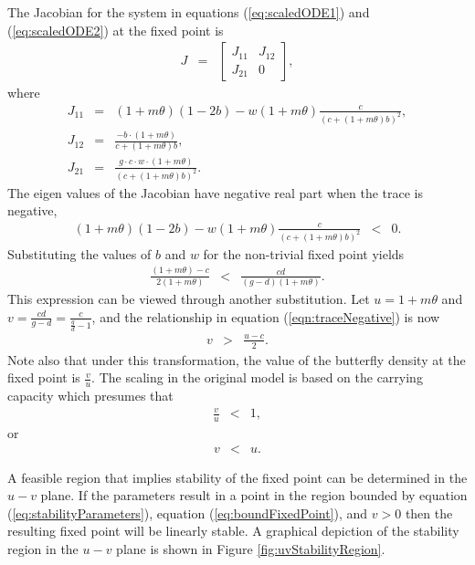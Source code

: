 \documentclass[12pt]{article}
\begin{document}
The Jacobian for the system in equations (\ref{eq:scaledODE1}) and
(\ref{eq:scaledODE2}) at the fixed point is
\begin{eqnarray}
  J & = &
          \left[
          \begin{array}{rr}
            J_{11} & J_{12} \\
            J_{21} & 0
          \end{array}
          \right],
\end{eqnarray}
where
\begin{eqnarray}
  \label{eq:jacobian}
  J_{11} & = & (1+m\theta)(1-2b) - w (1+m\theta)\frac{c}{(c+(1+m\theta)b)^2}, \\
  J_{12} & = & \frac{-b\cdot(1+m\theta)}{c+(1+m\theta)b}, \\
  J_{21} & = & \frac{g\cdot c \cdot w \cdot (1+m\theta)}{(c+(1+m\theta)b)^2}.
\end{eqnarray}
The eigen values of the Jacobian have negative real part when the
trace is negative,
\begin{eqnarray}
  (1+m\theta)(1-2b) - w (1+m\theta)\frac{c}{(c+(1+m\theta)b)^2} & < & 0.
\end{eqnarray}
Substituting the values of $b$ and $w$ for the non-trivial fixed point
yields
\begin{eqnarray}
  \label{eqn:traceNegative}
  \frac{(1+m\theta)-c}{2(1+m\theta)} & < & \frac{cd}{(g-d)(1+m\theta)}.
\end{eqnarray}
This expression can be viewed through another substitution. Let
$u=1+m\theta$ and $v=\frac{cd}{g-d}=\frac{c}{\frac{g}{d}-1}$, and the
relationship in equation (\ref{eqn:traceNegative}) is now
\begin{eqnarray}
  \label{eq:stabilityParameters}
  v & > & \frac{u-c}{2}.
\end{eqnarray}
Note also that under this transformation, the value of the butterfly
density at the fixed point is $\frac{v}{u}$. The scaling in the
original model is based on the carrying capacity which presumes that
\begin{eqnarray}
  \frac{v}{u} & < & 1,
\end{eqnarray}
or 
\begin{eqnarray}
  \label{eq:boundFixedPoint}
  v & < & u.
\end{eqnarray}

A feasible region that implies stability of the fixed point can be
determined in the $u-v$ plane. If the parameters result in a point in
the region bounded by equation (\ref{eq:stabilityParameters}),
equation (\ref{eq:boundFixedPoint}), and $v>0$ then the resulting
fixed point will be linearly stable. A graphical depiction of the
stability region in the $u-v$ plane is shown in Figure
\ref{fig:uvStabilityRegion}.
\end{document}
